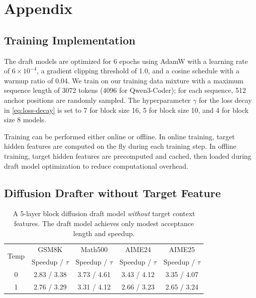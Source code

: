 \clearpage
\appendix
\section{Appendix}

\subsection{Training Implementation}
\label{appd:implementation}
The draft models are optimized for 6 epochs using AdamW with a learning rate of $6 \times 10^{-4}$, a gradient clipping threshold of 1.0, and a cosine schedule with a warmup ratio of 0.04. We train on our training data mixture with a maximum sequence length of 3072 tokens (4096 for Qwen3-Coder); for each sequence, 512 anchor positions are randomly sampled. The hyperparameter $\gamma$ for the loss decay in \autoref{eq:loss-decay} is set to 7 for block size 16, 5 for block size 10, and 4 for block size 8 models.

Training can be performed either online or offline. In online training, target hidden features are computed on the fly during each training step. In offline training, target hidden features are precomputed and cached, then loaded during draft model optimization to reduce computational overhead.

\subsection{Diffusion Drafter without Target Feature}

\begin{table}[h!]
\centering
\caption{ A 5-layer block diffusion draft model \emph{without} target context features. The draft model achieves only modest acceptance length and speedup.}
\label{tab:naive_diffusion}
\small
\setlength{\tabcolsep}{4pt}
\begin{tabular}{c cccc}
\toprule
\multirow{2}{*}{Temp}
& GSM8K
& Math500
& AIME24
& AIME25 \\
& \scriptsize Speedup / $\tau$
& \scriptsize Speedup / $\tau$
& \scriptsize Speedup / $\tau$
& \scriptsize Speedup / $\tau$ \\
\midrule
0
& 2.83 / 3.38
& 3.73 / 4.61
& 3.43 / 4.12
& 3.35 / 4.07 \\
1
& 2.76 / 3.29
& 3.31 / 4.12
& 2.66 / 3.23
& 2.65 / 3.24 \\
\bottomrule
\end{tabular}
\end{table}

